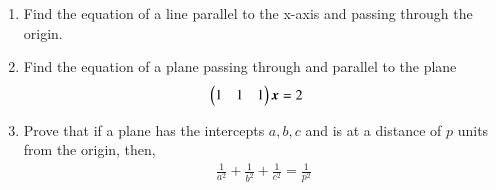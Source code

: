 \begin{enumerate}[label=\arabic*.,ref=\thesubsection.\theenumi]
\item Find the equation of a line parallel to the x-axis and passing through the origin.
\item Find the equation of a plane passing through  and parallel to the plane 
%
\begin{align}
\begin{pmatrix}1 & 1 & 1\end{pmatrix}\bm{x}&=2
\end{align}
%
\item Prove that if a plane has the intercepts $a, b, c$ and is at a distance of $p$ units from the origin, then, 
\begin{align}
\frac{1}{a^2}+\frac{1}{b^2}+\frac{1}{c^2}=\frac{1}{p^2} 
\end{align}

%
\end{enumerate}
